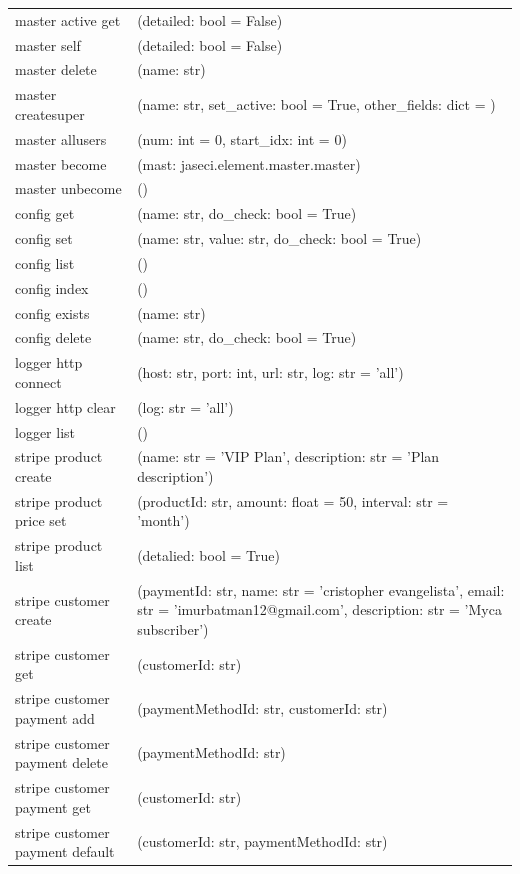 {\begin{longtable}{l p{10cm}}
        master active get & (detailed: bool = False) \\
        master self & (detailed: bool = False) \\
        master delete & (name: str) \\
        master createsuper & (name: str, set\_active: bool = True, other\_fields: dict = {}) \\
        master allusers & (num: int = 0, start\_idx: int = 0) \\
        master become & (mast: jaseci.element.master.master) \\
        master unbecome & () \\
        config get & (name: str, do\_check: bool = True) \\
        config set & (name: str, value: str, do\_check: bool = True) \\
        config list & () \\
        config index & () \\
        config exists & (name: str) \\
        config delete & (name: str, do\_check: bool = True) \\
        logger http connect & (host: str, port: int, url: str, log: str = 'all') \\
        logger http clear & (log: str = 'all') \\
        logger list & () \\
        stripe product create & (name: str = 'VIP Plan', description: str = 'Plan description') \\
        stripe product price set & (productId: str, amount: float = 50, interval: str = 'month') \\
        stripe product list & (detalied: bool = True) \\
        stripe customer create & (paymentId: str, name: str = 'cristopher evangelista', email: str = 'imurbatman12@gmail.com', description: str = 'Myca subscriber') \\
        stripe customer get & (customerId: str) \\
        stripe customer payment add & (paymentMethodId: str, customerId: str) \\
        stripe customer payment delete & (paymentMethodId: str) \\
        stripe customer payment get & (customerId: str) \\
        stripe customer payment default & (customerId: str, paymentMethodId: str) \\

\end{longtable}}
